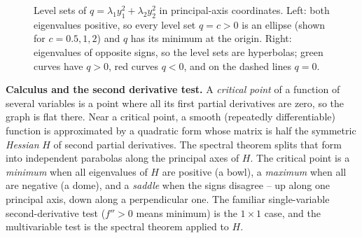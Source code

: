 \begin{figure}[htbp]
\centering
{}
\caption{Level sets of $q = \lambda_1 y_1^2 + \lambda_2 y_2^2$ in principal-axis
coordinates. Left: both eigenvalues positive, so every level set $q=c>0$ is an
ellipse (shown for $c = 0.5, 1, 2$) and $q$ has its minimum at the origin. Right:
eigenvalues of opposite signs, so the level sets are hyperbolas; green curves have
$q>0$, red curves $q<0$, and on the dashed lines $q=0$.}
\label{ch26:fig-signs}
\end{figure}

\begin{connectionbox}
\textbf{Calculus and the second derivative test.} A \emph{critical point} of a
function of several variables is a point where all its first partial derivatives
are zero, so the graph is flat there. Near a critical point, a smooth (repeatedly
differentiable) function is approximated by a quadratic form whose matrix is
half the symmetric \emph{Hessian} $H$ of second partial derivatives. The spectral
theorem splits that form into independent parabolas along the principal axes of
$H$. The critical
point is a \emph{minimum} when all eigenvalues of $H$ are positive (a bowl), a
\emph{maximum} when all are negative (a dome), and a \emph{saddle} when the signs
disagree -- up along one principal axis, down along a perpendicular one. The
familiar single-variable second-derivative test ($f''>0$ means minimum) is
the $1\times 1$ case, and the multivariable test is the spectral theorem applied
to $H$.
\end{connectionbox}

